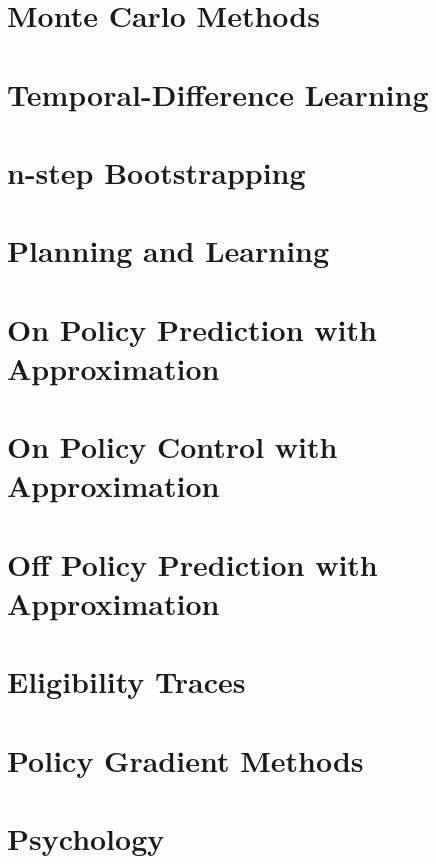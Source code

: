\documentclass[10pt, landscape, a4paper]{article}
\begin{document}
\begin{multicols}{3}
\begin{algorithm}[H]
            \caption{Policy Iteration - estimating $\pi \sim \pi_*$ - deterministic policy - [§4.3]}
        \end{algorithm}


        \section{Monte Carlo Methods}


        \section{Temporal-Difference Learning}


        \section{n-step Bootstrapping}


        \section{Planning and Learning}


        \section{On Policy Prediction with Approximation}


        \section{On Policy Control with Approximation}


        \section{Off Policy Prediction with Approximation}


        \section{Eligibility Traces}


        \section{Policy Gradient Methods}


        \section{Psychology}



\end{multicols}
\end{document}
